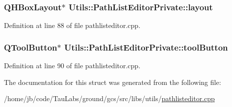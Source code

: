 \hypertarget{struct_utils_1_1_path_list_editor_private_a49b0f4d77c005208d794903fbad89fba}{
\subsubsection[{layout}]{\setlength{\rightskip}{0pt plus 5cm}\-Q\-H\-Box\-Layout$\ast$ {\bf \-Utils\-::\-Path\-List\-Editor\-Private\-::layout}}}\label{struct_utils_1_1_path_list_editor_private_a49b0f4d77c005208d794903fbad89fba}


\-Definition at line 88 of file pathlisteditor.\-cpp.

\hypertarget{struct_utils_1_1_path_list_editor_private_a885b729d9ae52f2f5eb13193cffd76e5}{
\subsubsection[{tool\-Button}]{\setlength{\rightskip}{0pt plus 5cm}\-Q\-Tool\-Button$\ast$ {\bf \-Utils\-::\-Path\-List\-Editor\-Private\-::tool\-Button}}}\label{struct_utils_1_1_path_list_editor_private_a885b729d9ae52f2f5eb13193cffd76e5}


\-Definition at line 90 of file pathlisteditor.\-cpp.



\-The documentation for this struct was generated from the following file\-:\begin{DoxyCompactItemize}
\item 
/home/jb/code/\-Tau\-Labs/ground/gcs/src/libs/utils/\hyperlink{pathlisteditor_8cpp}{pathlisteditor.\-cpp}\end{DoxyCompactItemize}
